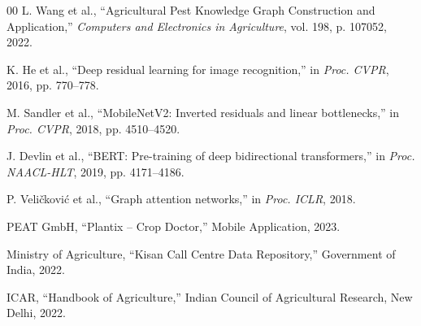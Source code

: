 \documentclass[conference]{IEEEtran}
\begin{document}
\begin{thebibliography}{00}
 L. Wang et al., ``Agricultural Pest Knowledge Graph Construction and Application,'' \textit{Computers and Electronics in Agriculture}, vol. 198, p. 107052, 2022.

 K. He et al., ``Deep residual learning for image recognition,'' in \textit{Proc. CVPR}, 2016, pp. 770--778.

 M. Sandler et al., ``MobileNetV2: Inverted residuals and linear bottlenecks,'' in \textit{Proc. CVPR}, 2018, pp. 4510--4520.

 J. Devlin et al., ``BERT: Pre-training of deep bidirectional transformers,'' in \textit{Proc. NAACL-HLT}, 2019, pp. 4171--4186.

 P. Veličković et al., ``Graph attention networks,'' in \textit{Proc. ICLR}, 2018.

 PEAT GmbH, ``Plantix -- Crop Doctor,'' Mobile Application, 2023.

 Ministry of Agriculture, ``Kisan Call Centre Data Repository,'' Government of India, 2022.

 ICAR, ``Handbook of Agriculture,'' Indian Council of Agricultural Research, New Delhi, 2022.

\end{thebibliography}
\end{document}
